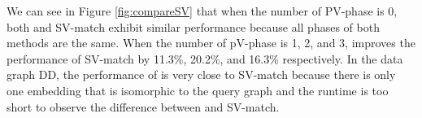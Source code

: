 We can see in Figure \ref{fig:compareSV} that when the number of PV-phase is 0, both \SystemName and SV-match exhibit similar performance because all phases of both methods are the same. When the number of pV-phase is 1, 2, and 3, \SystemName improves the performance of SV-match by 11.3\%, 20.2\%, and 16.3\% respectively. In the data graph DD, the performance of \SystemName is very close to SV-match because there is only one embedding that is isomorphic to the query graph and the runtime is too short to observe the difference between \SystemName and SV-match.
